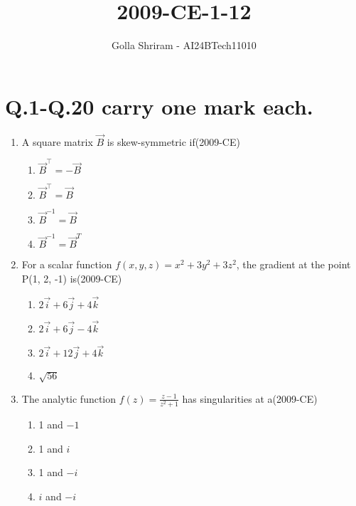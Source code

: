 \documentclass[journal,12pt,twocolumn]{IEEEtran}
\theoremstyle{remark}
\begin{document}

\onecolumn
\vspace{3cm}
\title{ 2009-CE-1-12 }
\author{Golla Shriram - AI24BTech11010}

\maketitle

\renewcommand{\thefigure}{\theenumi}
\renewcommand{\thetable}{\theenumi}

\section{ Q.1-Q.20 carry one mark each. }
                                                                           
 \begin{enumerate}
		 
	 \item A square matrix $\vec{B}$ is skew-symmetric if\hfill{(2009-CE)}

 \begin{enumerate}
  \item $\vec{B}^{\top} = - \vec{B}$
  \item $\vec{B}^{\top} = \vec{B}$
  \item $\vec{B}^{-1} =  \vec{B}$
  \item $\vec{B}^{-1} =  \vec{B}^{T}$
 \end{enumerate}

\item For a scalar function $f(x,y,z) = x^2+3y^2+3z^2$, the gradient at the point P(1, 2, -1) is\hfill{(2009-CE)}

\begin{enumerate}
	\item $2\overrightarrow{i}+6\overrightarrow{j}+4\overrightarrow{k} $
	\item $2\overrightarrow{i}+6\overrightarrow{j}-4\overrightarrow{k} $
	\item $2\overrightarrow{i}+12\overrightarrow{j}+4\overrightarrow{k} $
	\item $\sqrt{56}$
\end{enumerate}

\item The analytic function $f(z) = \frac{z-1}{z^{2}+1}$ has singularities at a\hfill{(2009-CE)}

	\begin{enumerate}
	\item 1 and $-1$
	\item 1 and $i$
	\item 1 and $-i$
	\item $i$ and $-i$
	\end{enumerate}



\end{enumerate}
\end{document}
